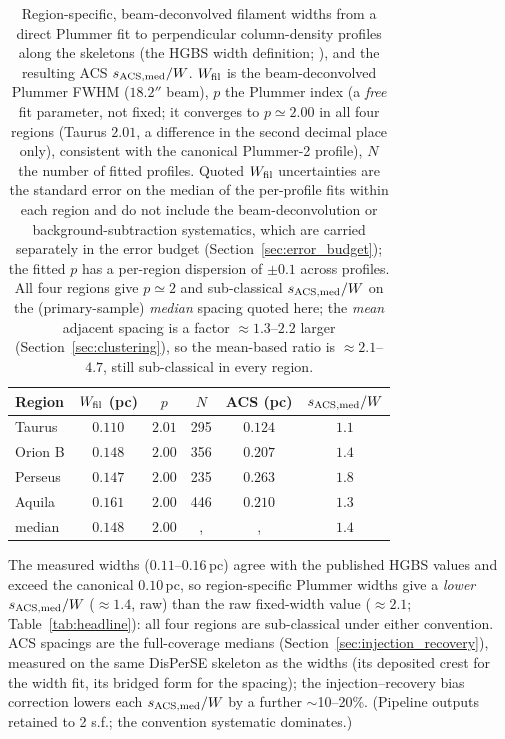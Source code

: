 \documentclass[usenatbib,twoside,twocolumn]{mnras}
\begin{document}
\begin{table}
\caption{Region-specific, beam-deconvolved filament widths from a direct Plummer fit to perpendicular column-density profiles along the skeletons (the HGBS width definition; \citealt{Arzoumanian2019}), and the resulting ACS $s_{\rm ACS,med}/W$. $W_{\rm fil}$ is the beam-deconvolved Plummer FWHM ($18.2''$ beam), $p$ the Plummer index (a \emph{free} fit parameter, not fixed; it converges to $p\simeq2.00$ in all four regions (Taurus $2.01$, a difference in the second decimal place only), consistent with the canonical Plummer-2 profile), $N$ the number of fitted profiles. Quoted $W_{\rm fil}$ uncertainties are the standard error on the median of the per-profile fits within each region and do not include the beam-deconvolution or background-subtraction systematics, which are carried separately in the error budget (Section~\ref{sec:error_budget}); the fitted $p$ has a per-region dispersion of $\pm0.1$ across profiles. All four regions give $p\simeq2$ and sub-classical $s_{\rm ACS,med}/W$ on the (primary-sample) \emph{median} spacing quoted here; the \emph{mean} adjacent spacing is a factor $\approx1.3$--$2.2$ larger (Section~\ref{sec:clustering}), so the mean-based ratio is $\approx2.1$--$4.7$, still sub-classical in every region.}
\label{tab:widths}
\footnotesize
\setlength{\tabcolsep}{3pt}
\begin{tabular}{p{1.7cm}ccccc}
\toprule
Region & $W_{\rm fil}$ (pc) & $p$ & $N$ & ACS (pc) & $s_{\rm ACS,med}/W$ \\
\midrule
Taurus  & $0.110$ & $2.01$ & 295 & $0.124$ & $1.1$ \\
Orion B & $0.148$ & $2.00$ & 356 & $0.207$ & $1.4$ \\
Perseus & $0.147$ & $2.00$ & 235 & $0.263$ & $1.8$ \\
Aquila  & $0.161$ & $2.00$ & 446 & $0.210$ & $1.3$ \\
\midrule
median  & $0.148$ & $2.00$ &, &, & $1.4$ \\
\bottomrule
\end{tabular}
\par\vspace{2pt}
\footnotesize The measured widths ($0.11$--$0.16$\,pc) agree with the published HGBS values and exceed the canonical $0.10$\,pc, so region-specific Plummer widths give a \emph{lower} $s_{\rm ACS,med}/W$ ($\approx1.4$, raw) than the raw fixed-width value ($\approx2.1$; Table~\ref{tab:headline}): all four regions are sub-classical under either convention. ACS spacings are the full-coverage medians (Section~\ref{sec:injection_recovery}), measured on the same DisPerSE skeleton as the widths (its deposited crest for the width fit, its bridged form for the spacing); the injection--recovery bias correction lowers each $s_{\rm ACS,med}/W$ by a further $\sim$10--20\%. (Pipeline outputs retained to 2 s.f.; the convention systematic dominates.)
\end{table}
\end{document}
